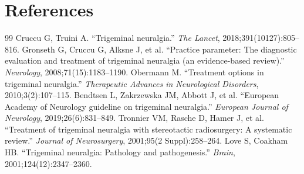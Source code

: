 \section*{References}
\begin{thebibliography}{99}
 Cruccu G, Truini A. ``Trigeminal neuralgia.'' \textit{The Lancet}, 2018;391(10127):805--816.
 Gronseth G, Cruccu G, Alksne J, et al. ``Practice parameter: The diagnostic evaluation and treatment of trigeminal neuralgia (an evidence-based review).'' \textit{Neurology}, 2008;71(15):1183--1190.
 Obermann M. ``Treatment options in trigeminal neuralgia.'' \textit{Therapeutic Advances in Neurological Disorders}, 2010;3(2):107--115.
 Bendtsen L, Zakrzewska JM, Abbott J, et al. ``European Academy of Neurology guideline on trigeminal neuralgia.'' \textit{European Journal of Neurology}, 2019;26(6):831--849.
 Tronnier VM, Rasche D, Hamer J, et al. ``Treatment of trigeminal neuralgia with stereotactic radiosurgery: A systematic review.'' \textit{Journal of Neurosurgery}, 2001;95(2 Suppl):258--264.
 Love S, Coakham HB. ``Trigeminal neuralgia: Pathology and pathogenesis.'' \textit{Brain}, 2001;124(12):2347--2360.
\end{thebibliography}
